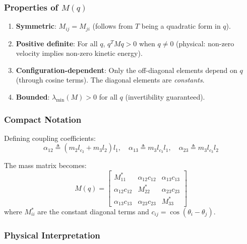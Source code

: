 \documentclass[11pt,a4paper]{article}
\newcommand{\vc}[1]{\bm{#1}}
\newcommand{\mat}[1]{\bm{#1}}
\newcommand{\dt}[1]{\dot{#1}}
\def\vc#1{#1}%
\def\mat#1{#1}%
\def\dt#1{#1}%
\def\bm#1{#1}%
\begin{document}
\subsubsection*{Properties of $\mat{M}(\vc{q})$}
\begin{enumerate}
    \item \textbf{Symmetric}: $M_{ij} = M_{ji}$ (follows from $T$ being a quadratic form in $\dt{\vc{q}}$).
    \item \textbf{Positive definite}: For all $\vc{q}$, $\dt{\vc{q}}^T \mat{M} \dt{\vc{q}} > 0$
          when $\dt{\vc{q}} \neq 0$ (physical: non-zero velocity implies non-zero kinetic energy).
    \item \textbf{Configuration-dependent}: Only the off-diagonal elements depend on $\vc{q}$
          (through cosine terms). The diagonal elements are \textit{constants}.
    \item \textbf{Bounded}: $\lambda_{\min}(\mat{M}) > 0$ for all $\vc{q}$ (invertibility guaranteed).
\end{enumerate}

\subsubsection*{Compact Notation}

Defining coupling coefficients:
\begin{equation}
    \alpha_{12} \triangleq (m_2 l_{c_2} + m_3 l_2) l_1, \quad
    \alpha_{13} \triangleq m_3 l_{c_3} l_1, \quad
    \alpha_{23} \triangleq m_3 l_{c_3} l_2
    \label{eq:alpha_defs}
\end{equation}

The mass matrix becomes:
\begin{equation}
\mat{M}(\vc{q}) =
\begin{bmatrix}
    M_{11}^{*} & \alpha_{12} c_{12} & \alpha_{13} c_{13} \\
    \alpha_{12} c_{12} & M_{22}^{*} & \alpha_{23} c_{23} \\
    \alpha_{13} c_{13} & \alpha_{23} c_{23} & M_{33}^{*}
\end{bmatrix}
\end{equation}
where $M_{ii}^{*}$ are the constant diagonal terms and $c_{ij} = \cos(\theta_i - \theta_j)$.

\subsubsection*{Physical Interpretation}
\end{document}
